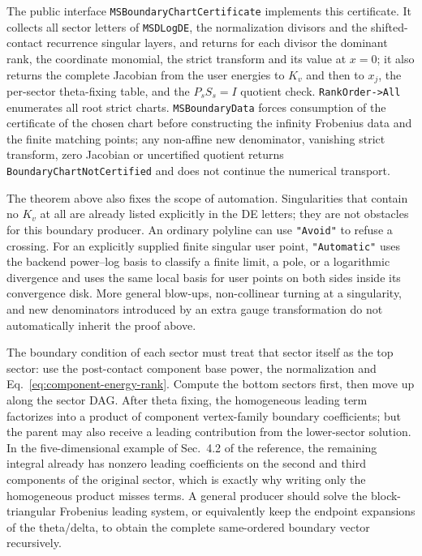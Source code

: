 \documentclass[11pt,a4paper]{article}
\begin{document}
The public interface \texttt{MSBoundaryChartCertificate} implements this certificate. It collects all sector letters of \texttt{MSDLogDE}, the normalization divisors and the shifted-contact recurrence singular layers, and returns for each divisor the dominant rank, the coordinate monomial, the strict transform and its value at $x=0$; it also returns the complete Jacobian from the user energies to $K_v$ and then to $x_j$, the per-sector theta-fixing table, and the $P_sS_s=I$ quotient check. \texttt{RankOrder->All} enumerates all root strict charts. \texttt{MSBoundaryData} forces consumption of the certificate of the chosen chart before constructing the infinity Frobenius data and the finite matching points; any non-affine new denominator, vanishing strict transform, zero Jacobian or uncertified quotient returns \texttt{BoundaryChartNotCertified} and does not continue the numerical transport.

The theorem above also fixes the scope of automation. Singularities that contain no $K_v$ at all are already listed explicitly in the DE letters; they are not obstacles for this boundary producer.  An ordinary polyline can use \texttt{"Avoid"} to refuse a crossing.  For an explicitly supplied finite singular user point, \texttt{"Automatic"} uses the backend power--log basis to classify a finite limit, a pole, or a logarithmic divergence and uses the same local basis for user points on both sides inside its convergence disk.  More general blow-ups, non-collinear turning at a singularity, and new denominators introduced by an extra gauge transformation do not automatically inherit the proof above.

The boundary condition of each sector must treat that sector itself as the top sector: use the post-contact component base power, the normalization and Eq.~\eqref{eq:component-energy-rank}. Compute the bottom sectors first, then move up along the sector DAG. After theta fixing, the homogeneous leading term factorizes into a product of component vertex-family boundary coefficients; but the parent may also receive a leading contribution from the lower-sector solution. In the five-dimensional example of Sec.~4.2 of the reference, the remaining integral already has nonzero leading coefficients on the second and third components of the original sector, which is exactly why writing only the homogeneous product misses terms. A general producer should solve the block-triangular Frobenius leading system, or equivalently keep the endpoint expansions of the theta/delta, to obtain the complete same-ordered boundary vector recursively.
\end{document}
